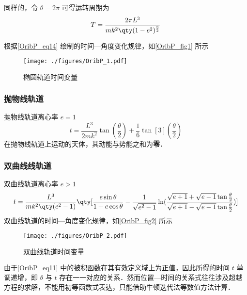 同样的，令 $\theta=2\pi$ 可得运转周期为
\begin{equation}
T=\frac{2\pi L^3}{mk^2\qty(1-e^2)^{\frac{3}{2}}}
\end{equation}

根据\autoref{OribP_eq14} 绘制的时间—角度变化规律，如\autoref{OribP_fig1} 所示
\begin{figure}[ht]
\centering
\texttt{[image: ./figures/OribP\_1.pdf]}
\caption{椭圆轨道时间变量} \label{OribP_fig1}
\end{figure}

\subsubsection{抛物线轨道}
抛物线轨道离心率 $e=1$
\begin{equation}
t = \frac{L^3}{2mk^2}\tan(\frac{\theta}{2})+\frac{1}{6}\tan[3](\frac{\theta}{2})
\end{equation}
在抛物线轨道上运动的天体，其动能与势能之和为\textbf{零}．

\subsubsection{双曲线线轨道}
双曲线轨道离心率 $e>1$
\begin{equation}
t = \frac{L^3}{mk^2\qty(e^2-1)}\qty[\frac{e\sin\theta}{1+e\cos\theta}-\frac{1}{\sqrt{e^2-1}}\ln(\frac{\sqrt{e+1}+\sqrt{e-1}\tan\frac{\theta}{2}}{\sqrt{e+1}-\sqrt{e-1}\tan\frac{\theta}{2}})]
\end{equation}
双曲线轨道的时间—角度变化规律，如\autoref{OribP_fig2} 所示
\begin{figure}[ht]
\centering
\texttt{[image: ./figures/OribP\_2.pdf]}
\caption{双曲线轨道时间变量} \label{OribP_fig2}
\end{figure}


由于\autoref{OribP_eq11} 中的被积函数在其有效定义域上为正值，因此所得的时间 $t$ 单调递增，即 $\theta$ 与 $t$ 存在一一对应的关系．然而位置—时间的关系式往往涉及超越方程的求解，不能用初等函数式表达，只能借助牛顿迭代法等数值方法计算．

